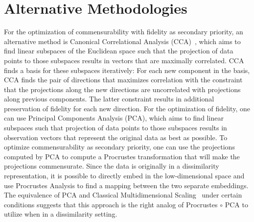 \documentclass[11pt]{article} %
\begin{document}

\section{Alternative Methodologies}
For the optimization of commensurability with fidelity as  secondary priority, an alternative method is Canonical Correlational Analysis (CCA)~\cite{Hardoon2004}, which aims to find linear subspaces of the Euclidean space  such that the projection of data points to those subspaces results in  vectors that are maximally correlated. CCA finds a basis for these subspaces iteratively: For each new component in the basis, CCA finds the pair of directions that maximizes correlation with the constraint that the projections along the new directions are  uncorrelated  with projections along previous components. The latter constraint results in  additional preservation of fidelity for each new direction. For the optimization of fidelity,  one can use Principal Components Analysis (PCA), which aims to find linear subspaces such that  projection of data points to those subspaces results in observation vectors that represent the original data as best as possible. To optimize commensurability as  secondary priority, one can use the projections computed by PCA to  compute a Procrustes transformation that will make the projections commensurate. Since the data is originally in a dissimilarity representation, it is possible to  directly embed in the low-dimensional space and use Procrustes Analysis to find a mapping between the two separate embeddings. The equivalence of PCA and Classical Multidimensional Scaling~\cite{CMDS} under certain conditions suggests that this approach is the right analog of Procrustes $\circ$ PCA to utilize when in a dissimilarity setting. 
\end{document}
